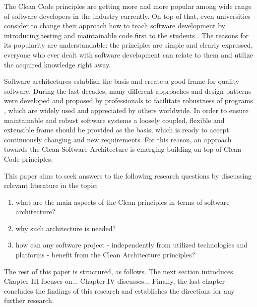 \documentclass[conference]{IEEEtran}
\begin{document}
The Clean Code principles are getting more and more popular among wide range of software developers in the industry currently. On top of that, even universities consider to change their approach how to teach software development by introducing testing and maintainable code first to the students \cite{studentscleancode}. The reasons for its popularity are understandable: the principles are simple and clearly expressed, everyone who ever dealt with software development can relate to them and utilize the acquired knowledge right away. 

Software architectures establish the basis and create a good frame for quality software. During the last decades, many different approaches and design patterns were developed and proposed by professionals to facilitate robustness of programs \cite{codecomplete} \cite{onionarchitecture} \cite{gof}, which are widely used and appreciated by others worldwide. In order to ensure maintainable and robust software systems a loosely coupled, flexible and extensible frame should be provided as the basis, which is ready to accept continuously changing and new requirements. For this reason, an approach towards the Clean Software Architecture is emerging \cite{cleanarchitecture} building on top of Clean Code principles. 

This paper aims to seek answers to the following research questions by discussing relevant literature in the topic: 

\begin{enumerate}
	\item what are the main aspects of the Clean principles in terms of software architecture?
	\item why such architecture is needed?
	\item how can any software project - independently from utilized technologies and platforms - benefit from the Clean Architecture principles?
\end{enumerate}  

The rest of this paper is structured, as follows. The next section introduces... Chapter III focuses on...
 Chapter IV discusses... Finally, the last chapter concludes the findings of this research and establishes the directions for any further research. 
\end{document}
